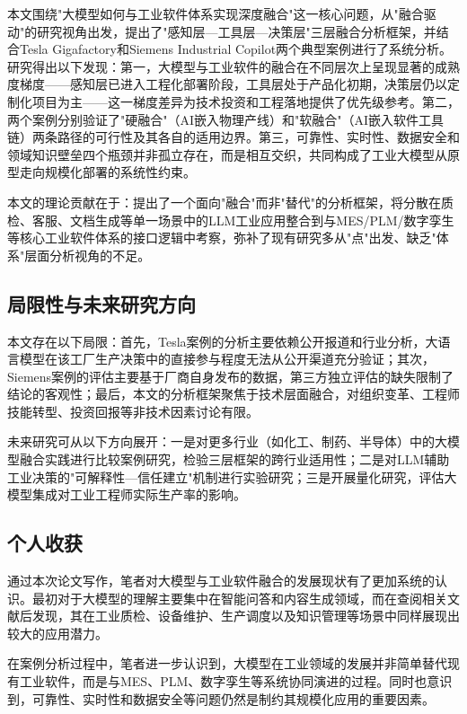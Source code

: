 \documentclass[12pt,a4paper]{ctexart}
\begin{document}
本文围绕"大模型如何与工业软件体系实现深度融合"这一核心问题，从"融合驱动"的研究视角出发，提出了"感知层—工具层—决策层"三层融合分析框架，并结合Tesla Gigafactory和Siemens Industrial Copilot两个典型案例进行了系统分析。研究得出以下发现：第一，大模型与工业软件的融合在不同层次上呈现显著的成熟度梯度——感知层已进入工程化部署阶段，工具层处于产品化初期，决策层仍以定制化项目为主——这一梯度差异为技术投资和工程落地提供了优先级参考。第二，两个案例分别验证了"硬融合"（AI嵌入物理产线）和"软融合"（AI嵌入软件工具链）两条路径的可行性及其各自的适用边界。第三，可靠性、实时性、数据安全和领域知识壁垒四个瓶颈并非孤立存在，而是相互交织，共同构成了工业大模型从原型走向规模化部署的系统性约束。

本文的理论贡献在于：提出了一个面向"融合"而非"替代"的分析框架，将分散在质检、客服、文档生成等单一场景中的LLM工业应用整合到与MES/PLM/数字孪生等核心工业软件体系的接口逻辑中考察，弥补了现有研究多从"点"出发、缺乏"体系"层面分析视角的不足。

\subsection{局限性与未来研究方向}

本文存在以下局限：首先，Tesla案例的分析主要依赖公开报道和行业分析，大语言模型在该工厂生产决策中的直接参与程度无法从公开渠道充分验证；其次，Siemens案例的评估主要基于厂商自身发布的数据，第三方独立评估的缺失限制了结论的客观性；最后，本文的分析框架聚焦于技术层面融合，对组织变革、工程师技能转型、投资回报等非技术因素讨论有限。

未来研究可从以下方向展开：一是对更多行业（如化工、制药、半导体）中的大模型融合实践进行比较案例研究，检验三层框架的跨行业适用性；二是对LLM辅助工业决策的"可解释性—信任建立"机制进行实验研究；三是开展量化研究，评估大模型集成对工业工程师实际生产率的影响。

\subsection{个人收获}

通过本次论文写作，笔者对大模型与工业软件融合的发展现状有了更加系统的认识。最初对于大模型的理解主要集中在智能问答和内容生成领域，而在查阅相关文献后发现，其在工业质检、设备维护、生产调度以及知识管理等场景中同样展现出较大的应用潜力。

在案例分析过程中，笔者进一步认识到，大模型在工业领域的发展并非简单替代现有工业软件，而是与MES、PLM、数字孪生等系统协同演进的过程。同时也意识到，可靠性、实时性和数据安全等问题仍然是制约其规模化应用的重要因素。
\end{document}
